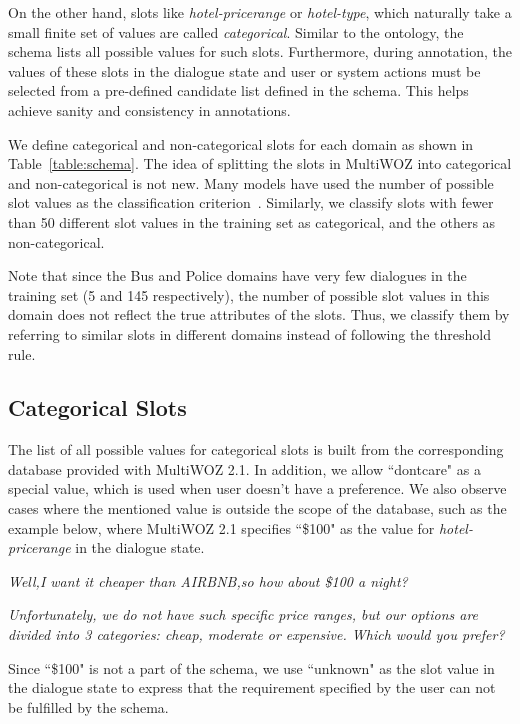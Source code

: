 On the other hand, slots like \textit{hotel-pricerange} or \textit{hotel-type}, which naturally take a small finite set of values are called \textit{categorical}. Similar to the ontology, the schema lists all possible values for such slots. Furthermore, during annotation, the values of these slots in the dialogue state and user or system actions must be selected from a pre-defined candidate list defined in the schema. This helps achieve sanity and consistency in annotations.

We define categorical and non-categorical slots for each domain as shown in Table~\ref{table:schema}. The idea of splitting the slots in MultiWOZ into categorical and non-categorical is not new. Many models have used the number of possible slot values as the classification criterion~\cite{zhang2019find}. Similarly, we classify slots with fewer than 50 different slot values in the training set as categorical, and the others as non-categorical. 

Note that since the Bus and Police domains have very few dialogues in the training set (5 and 145 respectively), the number of possible slot values in this domain does not reflect the true attributes of the slots. Thus, we classify them by referring to similar slots in different domains instead of following the threshold rule.

\subsection{Categorical Slots}

The list of all possible values for categorical slots is built from the corresponding database provided with MultiWOZ 2.1. In addition, we allow ``dontcare" as a special value, which is used when user doesn't have a preference.  We also observe cases where the mentioned value is outside the scope of the database, such as the example below, where MultiWOZ 2.1 specifies ``\$100" as the value for \textit{hotel-pricerange} in the dialogue state. 

\begin{description}[leftmargin=*, labelsep=0.2em, itemsep=0em]
\item[User:] \textit{Well,I want it cheaper than AIRBNB,so how about \$100 a night?}

\item[System:] \textit{Unfortunately, we do not have such specific price ranges, but our options are divided into 3 categories: cheap, moderate or expensive. Which would you prefer?}
\end{description}
Since ``\$100" is not a part of the schema, we use ``unknown" as the slot value in the dialogue state to express that the requirement specified by the user can not be fulfilled by the schema.

